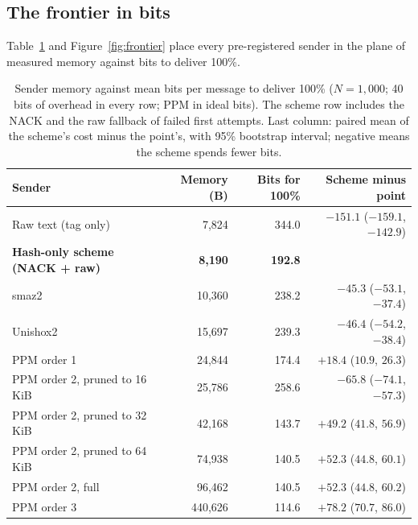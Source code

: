 \documentclass[11pt]{article}
\newcommand{\NA}{\textemdash}
\begin{document}
\subsection{The frontier in bits}

Table~\ref{tab:frontier} and Figure~\ref{fig:frontier} place every pre-registered sender in the plane
of measured memory against bits to deliver 100\%.

\begin{table}[t]
\centering
\caption{Sender memory against mean bits per message to deliver 100\% ($N = 1{,}000$; 40 bits of
overhead in every row; PPM in ideal bits). The scheme row includes the NACK and the raw fallback of
failed first attempts. Last column: paired mean of the scheme's cost minus the
point's, with 95\% bootstrap interval; negative means the scheme spends fewer bits.}
\label{tab:frontier}
\small
\begin{tabular}{lrrr}
\toprule
Sender & Memory (B) & Bits for 100\% & Scheme minus point \\
\midrule
Raw text (tag only) & 7,824 & 344.0 & $-151.1$ ($-159.1$, $-142.9$) \\
\textbf{Hash-only scheme (NACK + raw)} & \textbf{8,190} & \textbf{192.8} & \NA \\
smaz2 & 10,360 & 238.2 & $-45.3$ ($-53.1$, $-37.4$) \\
Unishox2 & 15,697 & 239.3 & $-46.4$ ($-54.2$, $-38.4$) \\
PPM order 1 & 24,844 & 174.4 & $+18.4$ ($10.9$, $26.3$) \\
PPM order 2, pruned to 16 KiB & 25,786 & 258.6 & $-65.8$ ($-74.1$, $-57.3$) \\
PPM order 2, pruned to 32 KiB & 42,168 & 143.7 & $+49.2$ ($41.8$, $56.9$) \\
PPM order 2, pruned to 64 KiB & 74,938 & 140.5 & $+52.3$ ($44.8$, $60.1$) \\
PPM order 2, full & 96,462 & 140.5 & $+52.3$ ($44.8$, $60.2$) \\
PPM order 3 & 440,626 & 114.6 & $+78.2$ ($70.7$, $86.0$) \\
\bottomrule
\end{tabular}
\end{table}
\end{document}
